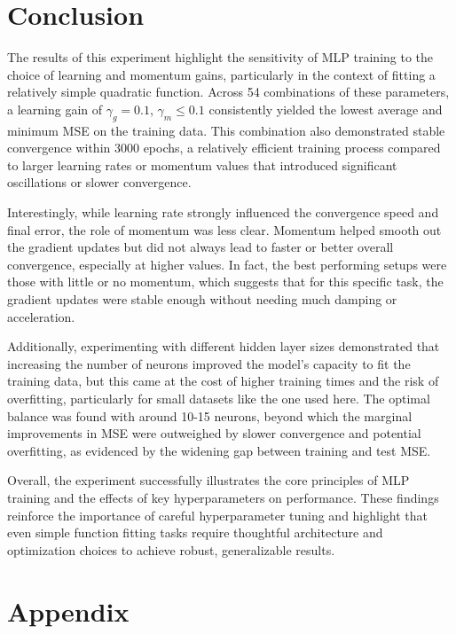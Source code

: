 \documentclass[11pt,pdftex,portrait,letterpaper]{article}
\begin{document}
\section{Conclusion}

The results of this experiment highlight the sensitivity of MLP training to the choice of learning and momentum gains, particularly in the context of fitting a relatively simple quadratic function. Across 54 combinations of these parameters, a learning gain of $\gamma_g=0.1$, $\gamma_m\leq0.1$ consistently yielded the lowest average and minimum MSE on the training data. This combination also demonstrated stable convergence within 3000 epochs, a relatively efficient training process compared to larger learning rates or momentum values that introduced significant oscillations or slower convergence.

Interestingly, while learning rate strongly influenced the convergence speed and final error, the role of momentum was less clear. Momentum helped smooth out the gradient updates but did not always lead to faster or better overall convergence, especially at higher values. In fact, the best performing setups were those with little or no momentum, which suggests that for this specific task, the gradient updates were stable enough without needing much damping or acceleration.

Additionally, experimenting with different hidden layer sizes demonstrated that increasing the number of neurons improved the model’s capacity to fit the training data, but this came at the cost of higher training times and the risk of overfitting, particularly for small datasets like the one used here. The optimal balance was found with around 10-15 neurons, beyond which the marginal improvements in MSE were outweighed by slower convergence and potential overfitting, as evidenced by the widening gap between training and test MSE.

Overall, the experiment successfully illustrates the core principles of MLP training and the effects of key hyperparameters on performance. These findings reinforce the importance of careful hyperparameter tuning and highlight that even simple function fitting tasks require thoughtful architecture and optimization choices to achieve robust, generalizable results.

\newpage
\printbibliography
\newpage
\section{Appendix}
\end{document}
